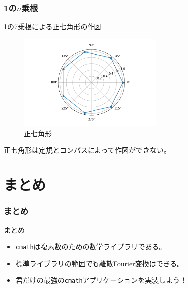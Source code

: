 \documentclass[dvipdfmx,11pt,notheorems]{beamer}
\theoremstyle{definition}
\begin{document}
\begin{frame}[fragile]\frametitle{1の$n$乗根}

\begin{block}{1の7乗根による正七角形の作図}
\begin{figure}
  \centering
  \includegraphics[width=7cm]{heptagon.png}
  \caption{正七角形}
\end{figure}
正七角形は定規とコンパスによって作図ができない。
\end{block}
\end{frame}

\section{まとめ}

\begin{frame}[fragile]\frametitle{まとめ}
\begin{block}{まとめ}
\begin{itemize}
\item \texttt{cmath}は複素数のための数学ライブラリである。
\item 標準ライブラリの範囲でも離散Fourier変換はできる。
\item 君だけの最強の\texttt{cmath}アプリケーションを実装しよう！
\end{itemize}
\end{block}
\end{frame}
\end{document}
